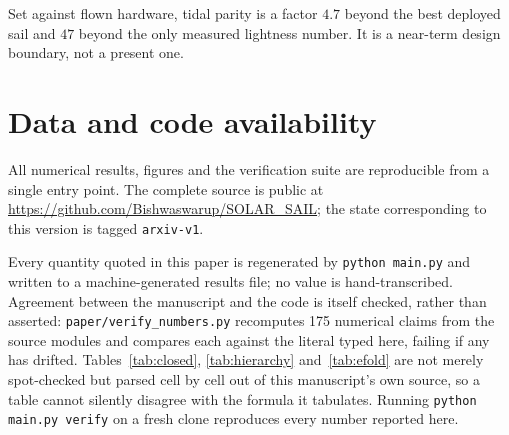 \documentclass[11pt,a4paper]{article}
\begin{document}
Set against flown hardware, tidal parity is a factor $4.7$ beyond the best
deployed sail and $47$ beyond the only measured lightness number. It is a
near-term design boundary, not a present one.

\section*{Data and code availability}

All numerical results, figures and the verification suite are reproducible from
a single entry point. The complete source is public at
\url{https://github.com/Bishwaswarup/SOLAR_SAIL}; the state corresponding to
this version is tagged \texttt{arxiv-v1}.

Every quantity quoted in this paper is regenerated by \texttt{python main.py}
and written to a machine-generated results file; no value is hand-transcribed.
Agreement between the manuscript and the code is itself checked, rather than
asserted: \texttt{paper/verify\_numbers.py} recomputes 175 numerical claims from
the source modules and compares each against the literal typed here, failing if
any has drifted. Tables~\ref{tab:closed}, \ref{tab:hierarchy}
and~\ref{tab:efold} are not merely spot-checked but parsed cell by cell out of
this manuscript's own source, so a table cannot silently disagree with the
formula it tabulates. Running \texttt{python main.py verify} on a fresh clone
reproduces every number reported here.



\end{document}
